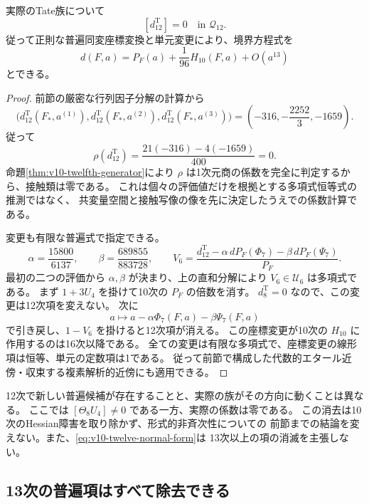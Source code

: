 \begin{theorem}
\label{thm:v10-actual-twelfth-zero}
実際のTate族について
\[
 [d^{\mathrm T}_{12}]=0\quad\text{in }\mathcal Q_{12}.
\]
従って正則な普遍同変座標変換と単元変更により、境界方程式を
\begin{equation}\label{eq:v10-twelve-normal-form}
 d(F,a)=P_F(a)+\frac1{96}H_{10}(F,a)+O(a^{13})
\end{equation}
とできる。
\end{theorem}
\begin{proof}
前節の厳密な行列因子分解の計算から
\[
 \bigl(d^{\mathrm T}_{12}(F_*,a^{(1)}),
       d^{\mathrm T}_{12}(F_*,a^{(2)}),
       d^{\mathrm T}_{12}(F_*,a^{(3)})\bigr)
 =\left(-316,-\frac{2252}{3},-1659\right).
\]
従って
\[
 \rho(d^{\mathrm T}_{12})
 =\frac{21(-316)-4(-1659)}{400}=0.
\]
命題\ref{thm:v10-twelfth-generator}により $\rho$ は1次元商の係数を完全に判定するから、接触類は零である。
これは個々の評価値だけを根拠とする多項式恒等式の推測ではなく、
共変量空間と接触写像の像を先に決定したうえでの係数計算である。

変更も有限な普遍式で指定できる。
\[
 \alpha=\frac{15800}{6137},\qquad
 \beta=\frac{689855}{883728},\qquad
 V_6=\frac{d^{\mathrm T}_{12}
       -\alpha\,dP_F(\Phi_7)-\beta\,dP_F(\Psi_7)}{P_F}.
\]
最初の二つの評価から $\alpha,\beta$ が決まり、上の直和分解により
$V_6\in\mathcal U_6$ は多項式である。
まず $1+3U_4$ を掛けて10次の $P_F$ の倍数を消す。
$d^{\mathrm T}_8=0$ なので、この変更は12次項を変えない。
次に
\[
 a\longmapsto a-\alpha\Phi_7(F,a)-\beta\Psi_7(F,a)
\]
で引き戻し、$1-V_6$ を掛けると12次項が消える。
この座標変更が10次の $H_{10}$ に作用するのは16次以降である。
全ての変更は有限な多項式で、座標変更の線形項は恒等、単元の定数項は1である。
従って前節で構成した代数的エタール近傍・収束する複素解析的近傍にも適用できる。
\end{proof}

12次で新しい普遍候補が存在することと、実際の族がその方向に動くことは異なる。
ここでは $[\Theta_8U_4]\ne0$ である一方、実際の係数は零である。
この消去は10次のHessian障害を取り除かず、形式的非斉次性についての
前節までの結論を変えない。また、\eqref{eq:v10-twelve-normal-form}は
13次以上の項の消滅を主張しない。


\subsection{13次の普遍項はすべて除去できる}
\label{subsec:v10-degree-thirteen}

